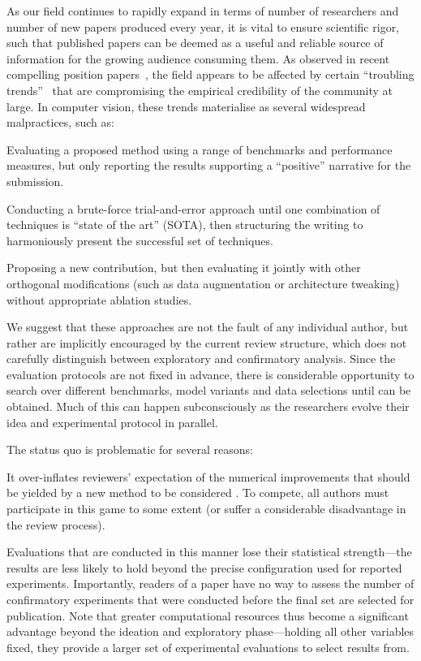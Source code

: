 \documentclass{article}
\begin{document}
As our field continues to rapidly expand in terms of number of researchers and number of new papers produced every year, it is vital to ensure scientific rigor, such that published papers can be deemed as a useful and reliable source of information for the growing audience consuming them.
As observed in recent compelling position papers~\cite{lipton2018troubling,forde2019scientific,gencoglu2019hark}, the field appears to be affected by certain ``troubling trends''~\cite{lipton2018troubling} that are compromising the empirical credibility of the community at large.
In computer vision, these trends materialise as several widespread malpractices, such as:
\begin{tight_it}
\item Evaluating a proposed method using a range of benchmarks and performance measures, but only reporting the results supporting a ``positive'' narrative for the submission.
\item Conducting a brute-force trial-and-error approach until one combination of techniques is  ``state of the art'' (SOTA), then structuring the writing to harmoniously present the successful set of techniques.
\item Proposing a new contribution, but then evaluating it jointly with other orthogonal modifications (such as data augmentation or architecture tweaking) without appropriate ablation studies.
\end{tight_it}
We suggest that these approaches are not the fault of any individual author, but rather are implicitly encouraged by the current review structure, which does not carefully distinguish between exploratory and confirmatory analysis.  Since the evaluation protocols are not fixed in advance, there is considerable opportunity to search over different benchmarks, model variants and data selections until  can be obtained.  Much of this can happen subconsciously as the researchers evolve their idea and experimental protocol in parallel. 

The status quo is problematic for several reasons: 
\begin{tight_it}
    \item It over-inflates reviewers' expectation of the numerical improvements that should be yielded by a new method to be considered .  To compete, all authors must participate in this game to some extent (or suffer a considerable disadvantage in the review process).
    \item Evaluations that are conducted in this manner lose their statistical strength---the results are less likely to hold beyond the precise configuration used for reported experiments.  Importantly, readers of a paper have no way to assess the number of confirmatory experiments that were conducted before the final set are selected for publication.  Note that greater computational resources thus become a significant advantage beyond the ideation and exploratory phase---holding all other variables fixed, they provide a larger set of experimental evaluations to select results from.  
\end{tight_it}
\end{document}
